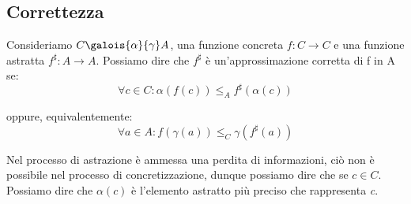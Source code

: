 \documentclass{article}
\begin{document}
        \subsection{Correttezza}
            Consideriamo $C \galois{\alpha}{\gamma} A$, una funzione concreta $f: C\rightarrow C$ e una funzione astratta $f^{\sharp}: A\rightarrow A$. Possiamo dire che $f^{\sharp}$ è un'approssimazione corretta di f in A se:
            \begin{equation*}
            \forall c\in C: \alpha(f(c))\leq_A f^{\sharp}(\alpha(c))
            \end{equation*}
            
            \noindent
            oppure, equivalentemente:
            \begin{equation*}
            \forall a\in A: f(\gamma(a))\leq_C \gamma(f^{\sharp}(a))
            \end{equation*}
            
            Nel processo di astrazione è ammessa una perdita di informazioni, ciò non è possibile nel processo di concretizzazione, dunque possiamo dire che se $c\in C$. Possiamo  dire che $\alpha(c)$ è l'elemento astratto più preciso che rappresenta \textit{c}.
            
\end{document}
